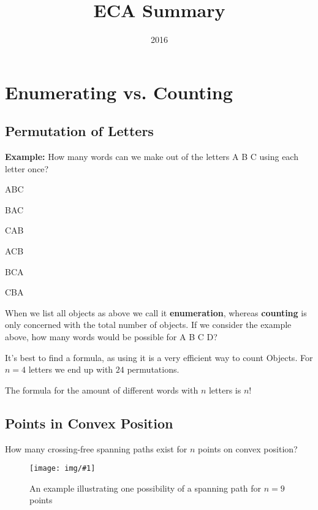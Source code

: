 \documentclass[12pt]{scrartcl}
\title{ECA Summary}
\date{2016}
\newcommand{\img}[3]{
\begin{figure}[H]
	\centering
	\texttt{[image: img/\#1]}
	\captionsetup{width=0.8\textwidth, justification=centering}
	\caption{#3}
\end{figure}
}
\begin{document}


\pagestyle{eca-style}

\section{Enumerating vs. Counting}

\subsection{Permutation of Letters}

{\bf Example:} How many words can we make out of the letters A B C using each letter once?

\begin{center}
\begin{inparaitem}
\item ABC \qquad
\item BAC \qquad
\item CAB
\end{inparaitem}

\begin{inparaitem}
\item ACB \qquad
\item BCA \qquad
\item CBA
\end{inparaitem}
\end{center}

When we list all objects as above we call it {\bf enumeration}, whereas {\bf counting} is only concerned with the total number of objects. If we consider the example above, how many words would be possible for A B C D?

It's best to find a formula, as using it is a very efficient way to count Objects. For $n = 4$ letters we end up with $24$ permutations.

The formula for the amount of different words with $n$ letters is $n!$

\subsection{Points in Convex Position}

How many crossing-free spanning paths exist for $n$ points on convex position?

\img{crossing_free_spanning_path}
    {scale=1.5, trim=220 550 430 125}
    {An example illustrating one possibility of a spanning path for $n=9$ points}
\end{document}
